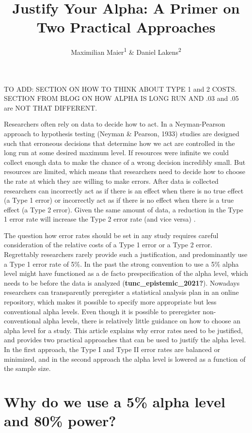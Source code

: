 \documentclass[
  english,
  ,jou, a4paper,floatsintext]{apa6}
\title{Justify Your Alpha: A Primer on Two Practical Approaches}
\author{Maximilian Maier\textsuperscript{1} \& Daniel Lakens\textsuperscript{2}}
\date{}
\affiliation{\vspace{0.5cm}\textsuperscript{1} University of Amsterdam, The Netherlands\\\textsuperscript{2} Eindhoven University of Technology, The Netherlands}
\begin{document}
\maketitle

TO ADD: SECTION ON HOW TO THINK ABOUT TYPE 1 and 2 COSTS. SECTION FROM BLOG ON HOW ALPHA IS LONG RUN AND .03 and .05 are NOT THAT DIFFERENT.

Researchers often rely on data to decide how to act. In a Neyman-Pearson approach to hypothesis testing (Neyman \& Pearson, 1933) studies are designed such that erroneous decisions that determine how we act are controlled in the long run at some desired maximum level. If resources were infinite we could collect enough data to make the chance of a wrong decision incredibly small. But resources are limited, which means that researchers need to decide how to choose the rate at which they are willing to make errors. After data is collected researchers can incorrectly act as if there is an effect when there is no true effect (a Type 1 error) or incorrectly act as if there is no effect when there is a true effect (a Type 2 error). Given the same amount of data, a reduction in the Type 1 error rate will increase the Type 2 error rate (and vice versa) .

The question how error rates should be set in any study requires careful consideration of the relative costs of a Type 1 error or a Type 2 error. Regrettably researchers rarely provide such a justification, and predominantly use a Type 1 error rate of 5\%. In the past the strong convention to use a 5\% alpha level might have functioned as a de facto prespecification of the alpha level, which needs to be before the data is analyzed (\textbf{tunc\_epistemic\_2021?}). Nowadays researchers can transparently preregister a statistical analysis plan in an online repository, which makes it possible to specify more appropriate but less conventional alpha levels. Even though it is possible to preregister non-conventional alpha levels, there is relatively little guidance on how to choose an alpha level for a study. This article explains why error rates need to be justified, and provides two practical approaches that can be used to justify the alpha level. In the first approach, the Type I and Type II error rates are balanced or minimized, and in the second approach the alpha level is lowered as a function of the sample size.

\hypertarget{why-do-we-use-a-5-alpha-level-and-80-power}{%
\section{Why do we use a 5\% alpha level and 80\% power?}\label{why-do-we-use-a-5-alpha-level-and-80-power}}
\end{document}
